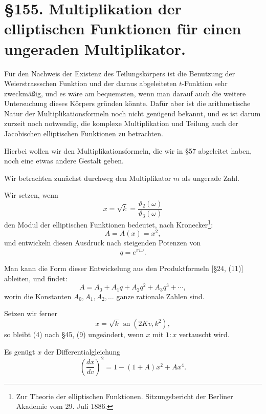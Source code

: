 \documentclass[12pt,a4paper]{article}
\begin{document}
\section*{\S 155. Multiplikation der elliptischen Funktionen f\"ur einen ungeraden Multiplikator.}

F\"ur den Nachweis der Existenz des Teilungsk\"orpers ist die Benutzung der Weierstrassschen Funktion und der daraus abgeleiteten $t$-Funktion sehr zweckm\"a\ss{}ig, und es w\"are am bequemsten, wenn man darauf auch die weitere Untersuchung dieses K\"orpers gr\"unden k\"onnte. Daf\"ur aber ist die arithmetische Natur der Multiplikationsformeln noch nicht gen\"ugend bekannt, und es ist darum zurzeit noch notwendig, die komplexe Multiplikation und Teilung auch der Jacobischen elliptischen Funktionen zu betrachten.

Hierbei wollen wir den Multiplikationsformeln, die wir in \S 57 abgeleitet haben, noch eine etwas andere Gestalt geben.

Wir betrachten zun\"achst durchweg den Multiplikator $m$ als ungerade Zahl.

Wir setzen, wenn
\begin{equation}x = \sqrt{k} = \frac{\vartheta_2(\omega)}{\vartheta_3(\omega)}\end{equation}
den Modul der elliptischen Funktionen bedeutet, nach Kronecker\footnote{Zur Theorie der elliptischen Funktionen. Sitzungsbericht der Berliner Akademie vom 29. Juli 1886.}:
\begin{equation}A = A(x) = x^2,\end{equation}
und entwickeln diesen Ausdruck nach steigenden Potenzen von
\[q = e^{\pi i \omega}.\]

Man kann die Form dieser Entwickelung aus den Produktformeln [\S 24, (11)] ableiten, und findet:
\begin{equation}A = A_0 + A_1 q + A_2 q^2 + A_3 q^3 + \cdots,\end{equation}
worin die Konstanten $A_0, A_1, A_2, \ldots$ ganze rationale Zahlen sind.

Setzen wir ferner
\begin{equation}x = \sqrt{k} \, \operatorname{sn}(2Kv, k^2),\end{equation}
so bleibt (4) nach \S 45, (9) unge\"andert, wenn $x$ mit $1:x$ vertauscht wird.

Es gen\"ugt $x$ der Differentialgleichung
\begin{equation}\left(\frac{dx}{dv}\right)^2 = 1 - (1 + A)x^2 + Ax^4.\end{equation}
\end{document}
